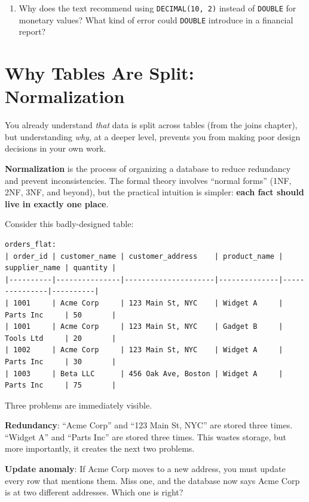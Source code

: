 \documentclass[
  letterpaper,
  DIV=11,
  numbers=noendperiod]{scrreprt}
\begin{document}
\begin{tcolorbox}
\begin{enumerate}
\begin{codelisting}
  \end{codelisting}
\item
  Why does the text recommend using \texttt{DECIMAL(10,\ 2)} instead of
  \texttt{DOUBLE} for monetary values? What kind of error could
  \texttt{DOUBLE} introduce in a financial report?
\end{enumerate}

\end{tcolorbox}

\section{Why Tables Are Split:
Normalization}\label{why-tables-are-split-normalization}

You already understand \emph{that} data is split across tables (from the
joins chapter), but understanding \emph{why}, at a deeper level,
prevents you from making poor design decisions in your own work.

\textbf{Normalization} is the process of organizing a database to reduce
redundancy and prevent inconsistencies. The formal theory involves
``normal forms'' (1NF, 2NF, 3NF, and beyond), but the practical
intuition is simpler: \textbf{each fact should live in exactly one
place}.

Consider this badly-designed table:

\begin{verbatim}
orders_flat:
| order_id | customer_name | customer_address    | product_name | supplier_name | quantity |
|----------|---------------|---------------------|--------------|---------------|----------|
| 1001     | Acme Corp     | 123 Main St, NYC    | Widget A     | Parts Inc     | 50       |
| 1001     | Acme Corp     | 123 Main St, NYC    | Gadget B     | Tools Ltd     | 20       |
| 1002     | Acme Corp     | 123 Main St, NYC    | Widget A     | Parts Inc     | 30       |
| 1003     | Beta LLC      | 456 Oak Ave, Boston | Widget A     | Parts Inc     | 75       |
\end{verbatim}

Three problems are immediately visible.

\textbf{Redundancy}: ``Acme Corp'' and ``123 Main St, NYC'' are stored
three times. ``Widget A'' and ``Parts Inc'' are stored three times. This
wastes storage, but more importantly, it creates the next two problems.

\textbf{Update anomaly}: If Acme Corp moves to a new address, you must
update every row that mentions them. Miss one, and the database now says
Acme Corp is at two different addresses. Which one is right?
\end{document}
